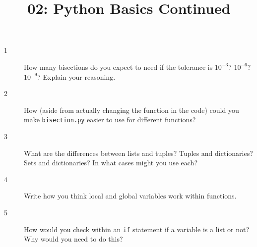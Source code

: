 \documentclass[10pt]{amsart}
\title{02: Python Basics Continued}
\begin{document}
\maketitle

\begin{description}
\item[1] How many bisections do you expect to need if the tolerance is
$10^{-3}$? $10^{-6}$? $10^{-9}$? Explain your reasoning.
\vspace{0.75in}

\item[2] How (aside from actually changing the function in the code) could you
make \verb+bisection.py+ easier to use for different functions?
\vspace{0.75in}

\item[3] What are the differences between lists and tuples? Tuples and
dictionaries? Sets and dictionaries? In what cases might you use each?
\vspace{0.75in}

\item[4] Write how you think local and global variables work within functions.
\vspace{0.75in}

\item[5] How would you check within an \verb+if+ statement if a variable is a
list or not? Why would you need to do this?
\vspace{0.75in}
\end{description}
\end{document}
